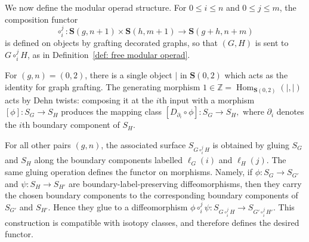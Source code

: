 \documentclass{amsart}
\newcommand{\Z}{\mathbb{Z}}
\newcommand{\bS}{\mathbf{S}}
\newcommand{\Hom}{\operatorname{Hom}}
\theoremstyle{definition}
\numberwithin{equation}{section}
\begin{document}
We now define the modular operad structure. For $0\leq i\leq n$ and
$0\leq j\leq m$, the composition functor
\[
\circ_i^j:\bS(g,n+1)\times \bS(h,m+1)\longrightarrow \bS(g+h,n+m)
\]
is defined on objects by grafting decorated graphs, so that
$(G,H)$ is sent to $G\circ_i^j H$, as in
Definition~\ref{def: free modular operad}. 

For $(g,n)=(0,2)$, there is a single object $|$ in $\bS(0,2)$ which acts as the identity for graph grafting. The generating morphism $1\in \mathbb Z=\Hom_{\bS(0,2)}(|,|)$ acts by Dehn twists: composing it at the $i$th input with a morphism $[\phi]:S_G\to S_H$ produces the mapping class $[D_{\partial_i}\circ \phi]:S_G\to S_H,$
where $\partial_i$ denotes the $i$th boundary component of $S_H$. 


For all other pairs $(g,n)$, the associated surface $S_{G\circ_i^j H}$ is obtained by gluing $S_G$ and $S_H$ along the boundary components labelled $\ell_G(i)$ and $\ell_H(j)$. The same gluing operation defines the functor on morphisms. Namely, if $\phi:S_G\to S_{G'}$ and $\psi:S_H\to S_{H'}$ are boundary-label-preserving diffeomorphisms, then they carry the chosen boundary components to the corresponding boundary components of $S_{G'}$ and $S_{H'}$. Hence they glue to a diffeomorphism $\phi\circ_i^j\psi:
S_{G\circ_i^j H}
\longrightarrow
S_{G'\circ_i^j H'}.$
This construction is compatible with isotopy classes, and therefore defines the desired functor.


\end{document}
